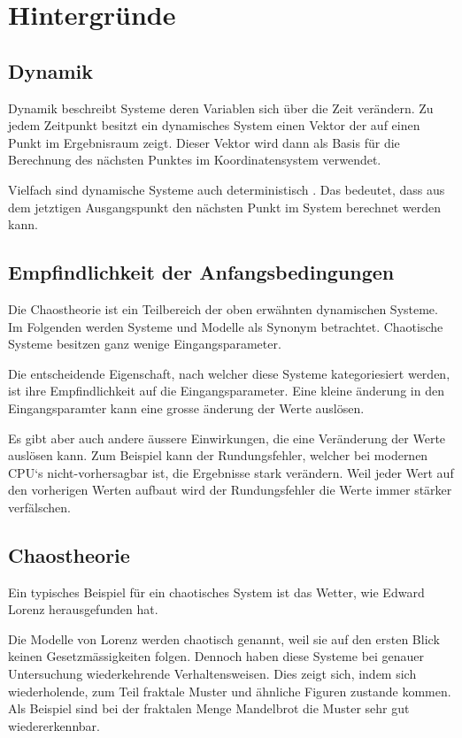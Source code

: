 
\section{Hintergründe}

\subsection{Dynamik} %
Dynamik beschreibt Systeme deren Variablen sich über die Zeit verändern. Zu jedem Zeitpunkt besitzt ein dynamisches System einen Vektor der auf einen Punkt im Ergebnisraum zeigt. Dieser Vektor wird dann als Basis für die Berechnung des nächsten Punktes im Koordinatensystem verwendet.

Vielfach sind dynamische Systeme auch deterministisch \cite{wikidynamicalsystems}. Das bedeutet, dass aus dem jetztigen Ausgangspunkt den nächsten Punkt im System berechnet werden kann.


\subsection{Empfindlichkeit der Anfangsbedingungen}
Die Chaostheorie ist ein Teilbereich der oben erwähnten dynamischen Systeme. Im Folgenden werden Systeme und Modelle als Synonym betrachtet. Chaotische Systeme besitzen ganz wenige Eingangsparameter.

Die entscheidende Eigenschaft, nach welcher diese Systeme kategoriesiert werden, ist ihre Empfindlichkeit auf die Eingangsparameter. Eine kleine änderung in den Eingangsparamter kann eine grosse änderung der Werte auslösen.

Es gibt aber auch andere äussere Einwirkungen, die eine Veränderung der Werte auslösen kann. Zum Beispiel kann der Rundungsfehler, welcher bei modernen CPU‘s nicht-vorhersagbar ist, die Ergebnisse stark verändern. Weil jeder Wert auf den vorherigen Werten aufbaut wird der Rundungsfehler die Werte immer stärker verfälschen.

\subsection{Chaostheorie}
Ein typisches Beispiel für ein chaotisches System ist das Wetter, wie Edward Lorenz herausgefunden hat. 

Die Modelle von Lorenz werden chaotisch genannt, weil sie auf den ersten Blick keinen Gesetzmässigkeiten folgen. Dennoch haben diese Systeme bei genauer Untersuchung wiederkehrende Verhaltensweisen. Dies zeigt sich, indem sich wiederholende, zum Teil fraktale Muster und ähnliche Figuren zustande kommen. Als Beispiel sind bei der fraktalen Menge Mandelbrot die Muster sehr gut wiedererkennbar. 

